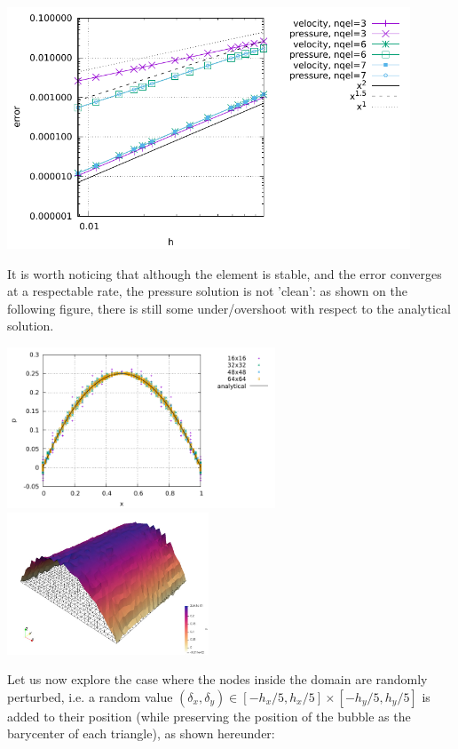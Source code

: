 \begin{center}
\includegraphics[width=12cm]{python_codes/fieldstone_47/images/reg/errors}
\end{center}

It is worth noticing that although the element is stable, and the error converges
at a respectable rate, the pressure solution is not 'clean': as shown on the 
following figure, there is still some under/overshoot with respect to the analytical solution.

\begin{center}
\includegraphics[width=8cm]{python_codes/fieldstone_47/images/reg/pressure.pdf}
\includegraphics[width=6cm]{python_codes/fieldstone_47/images/rand/press}
\end{center}

Let us now explore the case where the nodes inside the domain are randomly perturbed, i.e. 
a random value  $(\delta_x,\delta_y)\in[-h_x/5,h_x/5]\times[-h_y/5,h_y/5]$ is added 
to their position (while preserving the position of the bubble as the barycenter of each triangle), 
as shown hereunder:

